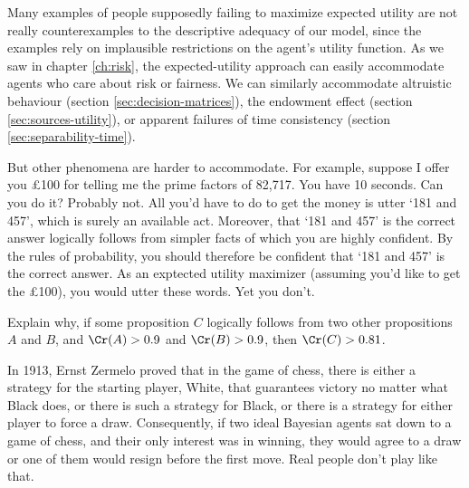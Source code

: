 Many examples of people supposedly failing to maximize expected
utility are not really counterexamples to the descriptive adequacy of
our model, since the examples rely on implausible restrictions on the
agent's utility function. As we saw in chapter \ref{ch:risk}, the
expected-utility approach can easily accommodate agents who care about
risk or fairness. We can similarly accommodate altruistic behaviour
(section \ref{sec:decision-matrices}), the endowment effect (section
\ref{sec:sources-utility}), or apparent failures of time consistency
(section \ref{sec:separability-time}).


But other phenomena are harder to accommodate. For example, suppose I
offer you £100 for telling me the prime factors of 82,717. You have 10
seconds. Can you do it? Probably not. All you'd have to do to get the
money is utter `181 and 457', which is surely an available act.
Moreover, that `181 and 457' is the correct answer logically follows
from simpler facts of which you are highly confident. By the rules of
probability, you should therefore be confident that `181 and 457' is
the correct answer. As an exptected utility maximizer (assuming you'd like
to get the £100), you would utter these words. Yet you don't.

\begin{exercise}{2}
  Explain why, if some proposition $C$ logically follows from two
  other propositions $A$ and $B$, and $\Cr(A) > 0.9$ and $\Cr(B) >
  0.9$, then $\Cr(C) > 0.81$.
\end{exercise}

In 1913, Ernst Zermelo proved that in the game of chess, there is
either a strategy for the starting player, White, that guarantees
victory no matter what Black does, or there is such a strategy for
Black, or there is a strategy for either player to force a
draw. Consequently, if two ideal Bayesian agents sat down to a game of
chess, and their only interest was in winning, they would agree to a
draw or one of them would resign before the first move. Real people
don't play like that.


